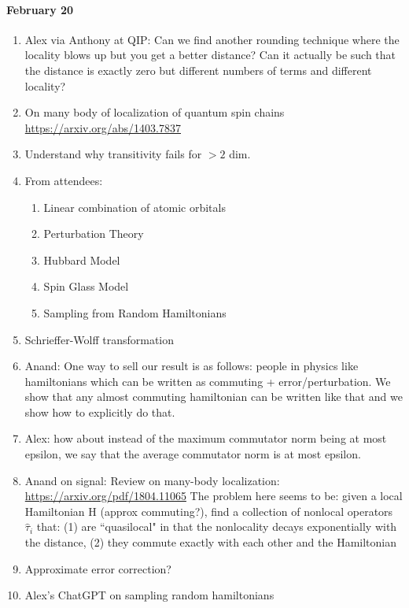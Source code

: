 \documentclass[11pt]{article}
\theoremstyle{plain}
\begin{document}
\paragraph{February 20}

\begin{enumerate}
    \item Alex via Anthony at QIP: Can we find another rounding technique where the locality blows up but you get a better distance? Can it actually be such that the distance is exactly zero but different numbers of terms and different locality?
    \item On many body of localization of quantum spin chains \url{https://arxiv.org/abs/1403.7837}
    \item Understand why transitivity fails for $> 2 $ dim.
    \item From attendees:
    \begin{enumerate}
        \item Linear combination of atomic orbitals
        \item Perturbation Theory
        \item Hubbard Model
        \item Spin Glass Model
        \item Sampling from Random Hamiltonians
    \end{enumerate}
    \item Schrieffer-Wolff transformation
    \item Anand: One way to sell our result is as follows: people in physics like hamiltonians which can be written as commuting + error/perturbation. We show that any almost commuting hamiltonian can be written like that and we show how to explicitly do that.
    \item Alex: how about instead of the maximum commutator norm being at most epsilon, we say that the average commutator norm is at most epsilon.
    \item Anand on signal: Review on many-body localization: \url{https://arxiv.org/pdf/1804.11065}
    The problem here seems to be: given a local Hamiltonian H (approx commuting?), find a collection of nonlocal operators $\hat{\tau}_i$ that: (1) are ``quasilocal" in that the nonlocality decays exponentially with the distance, (2) they commute exactly with each other and the Hamiltonian
    \item Approximate error correction? 
    \item Alex's ChatGPT on sampling random hamiltonians

\end{enumerate}
\end{document}
